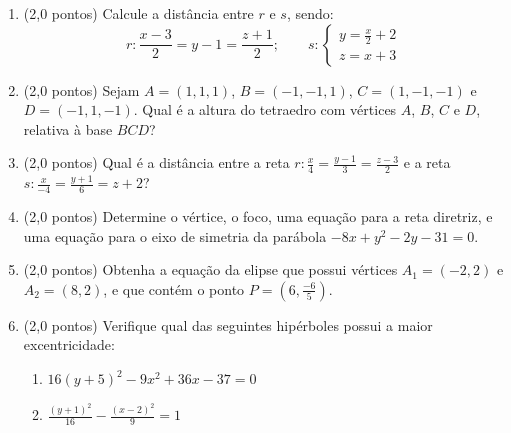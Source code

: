 \documentclass[12pt,a4paper]{article}
\begin{document}
\begin{enumerate}
\item (2,0 pontos) Calcule a distância entre $r$ e $s$, sendo:
\[
r: \frac{x-3}{2} = y-1 = \frac{z+1}{2}; \qquad
s: \begin{cases}
y = \frac{x}{2} + 2\\
z= x+3
\end{cases}
\]
\item (2,0 pontos) Sejam $A=(1,1,1)$, $B=(-1,-1,1)$, $C=(1,-1,-1)$ e $D=(-1,1,-1)$. Qual é a altura do tetraedro com vértices $A$, $B$, $C$ e $D$, relativa à base $BCD$?
\item (2,0 pontos) Qual é a distância entre a reta $r: \frac{x}{4} = \frac{y-1}{3} = \frac{z-3}{2}$ e a reta $s: \frac{x}{-4} = \frac{y+1}{6} = z+2$?

\item (2,0 pontos) Determine o vértice, o foco, uma equação para a reta diretriz, e uma equação para o eixo de simetria da parábola $- 8x + y^2 - 2y - 31 = 0$.
\item (2,0 pontos) Obtenha a equação da elipse que possui vértices $A_1=(-2,2)$ e $A_2 = (8,2)$, e que contém o ponto $P = (6, \frac{-6}{5})$.
\item (2,0 pontos) Verifique qual das seguintes hipérboles possui a maior excentricidade:
\begin{multicols}{2}
\begin{enumerate}
\item $16(y+5)^2-9x^2+36x-37 = 0$
\item $\frac{(y+1)^2}{16}-\frac{(x-2)^2}{9} = 1$
\end{enumerate}
\end{multicols}
\end{enumerate}
\end{document}
